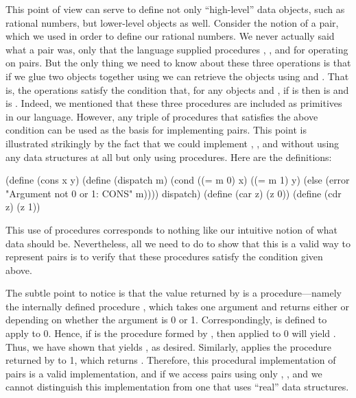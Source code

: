 This point of view can serve to define not only ``high-level'' data objects,
such as rational numbers, but lower-level objects as well.  Consider the notion
of a pair, which we used in order to define our rational numbers.  We never
actually said what a pair was, only that the language supplied procedures
, , and  for operating on pairs.  But the only
thing we need to know about these three operations is that if we glue two
objects together using  we can retrieve the objects using 
and .  That is, the operations satisfy the condition that, for any
objects  and , if  is  then  is  and  is .  Indeed, we mentioned that
these three procedures are included as primitives in our language.  However,
any triple of procedures that satisfies the above condition can be used as the
basis for implementing pairs.  This point is illustrated strikingly by the fact
that we could implement , , and  without using
any data structures at all but only using procedures.  Here are the
definitions:

\begin{codeBlock}
(define (cons x y)
  (define (dispatch m)
    (cond ((= m 0) x)
          ((= m 1) y)
          (else
            (error "Argument not 0 or 1: CONS" m))))
  dispatch)
(define (car z) (z 0))
(define (cdr z) (z 1))
\end{codeBlock}

\noindent
This use of procedures corresponds to nothing like our intuitive notion of what
data should be.  Nevertheless, all we need to do to show that this is a valid
way to represent pairs is to verify that these procedures satisfy the condition
given above.

The subtle point to notice is that the value returned by  is a
procedure---namely the internally defined procedure , which
takes one argument and returns either  or  depending on whether
the argument is 0 or 1.  Correspondingly,  is defined to apply
 to 0.  Hence, if  is the procedure formed by , then  applied to 0 will yield . Thus, we have shown that
 yields , as desired.  Similarly,  applies the procedure returned by  to 1, which
returns .  Therefore, this procedural implementation of pairs is a
valid implementation, and if we access pairs using only ,
, and  we cannot distinguish this implementation from one
that uses ``real'' data structures.

